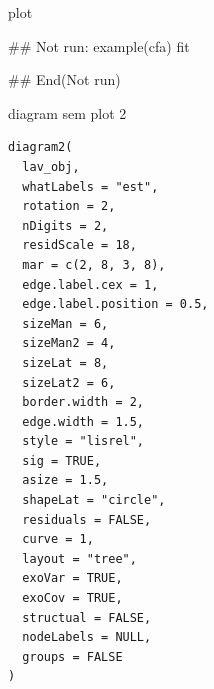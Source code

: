 \documentclass[a4paper]{book}
\begin{document}
%
\begin{Value}
plot
\end{Value}
%
\begin{Examples}
\begin{ExampleCode}

\#\# Not run: 
example(cfa)
fit %


## End(Not run)

\end{ExampleCode}
\end{Examples}
%
\begin{Description}
diagram sem plot 2
\end{Description}
%
\begin{Usage}
\begin{verbatim}
diagram2(
  lav_obj,
  whatLabels = "est",
  rotation = 2,
  nDigits = 2,
  residScale = 18,
  mar = c(2, 8, 3, 8),
  edge.label.cex = 1,
  edge.label.position = 0.5,
  sizeMan = 6,
  sizeMan2 = 4,
  sizeLat = 8,
  sizeLat2 = 6,
  border.width = 2,
  edge.width = 1.5,
  style = "lisrel",
  sig = TRUE,
  asize = 1.5,
  shapeLat = "circle",
  residuals = FALSE,
  curve = 1,
  layout = "tree",
  exoVar = TRUE,
  exoCov = TRUE,
  structual = FALSE,
  nodeLabels = NULL,
  groups = FALSE
)
\end{verbatim}
\end{Usage}
%
\end{document}
